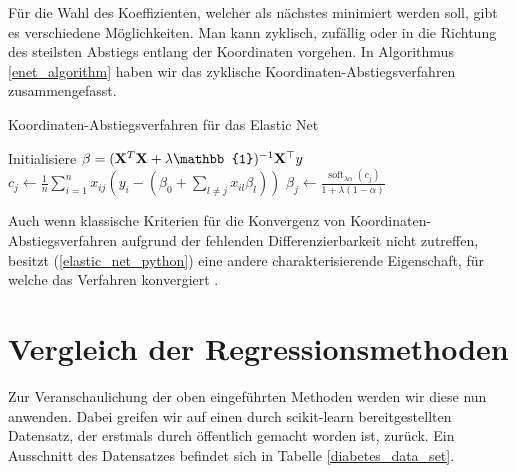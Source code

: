 Für die Wahl des Koeffizienten, welcher als nächstes minimiert werden soll, gibt es verschiedene Möglichkeiten. Man kann zyklisch, zufällig oder in die Richtung des steilsten Abstiegs entlang der Koordinaten vorgehen. In Algorithmus \ref{enet_algorithm} haben wir das zyklische Koordinaten-Abstiegsverfahren zusammengefasst.

\begin{algorithm}[tbh]
    \caption{Koordinaten-Abstiegsverfahren für das Elastic Net}
    \label{enet_algorithm}
    \begin{algorithmic}[1]
        	\State Initialisiere $\beta = (\mat X^T\mat X + \lambda\mat{\mathbb{1}})^{-1}\mat X^{\top}y$
                	\State $c_j \gets \frac{1}{n}\sum_{i=1}^n x_{ij}(y_i - (\beta_0 + \sum_{l \neq j} x_{il}\beta_l))$
                	\State $\beta_j \gets \frac{\operatorname{soft}_{\lambda\alpha}(c_j)}{1 + \lambda (1-\alpha)}$
        		\EndFor
        	\EndWhile
        \EndProcedure
    \end{algorithmic}
\end{algorithm} 

Auch wenn klassische Kriterien für die Konvergenz von Koordinaten-Abstiegsverfahren aufgrund der fehlenden Differenzierbarkeit nicht zutreffen, besitzt (\ref{elastic_net_python}) eine andere charakterisierende Eigenschaft, für welche das Verfahren konvergiert \cite{tseng}.




\section{Vergleich der Regressionsmethoden}
\label{comparison_linear_models}

Zur Veranschaulichung der oben eingeführten Methoden werden wir diese nun anwenden. Dabei greifen wir auf einen durch scikit-learn \cite{scikit_learn} bereitgestellten Datensatz, der erstmals durch \cite{efron_lars} öffentlich gemacht worden ist, zurück. Ein Ausschnitt des Datensatzes befindet sich in Tabelle \ref{diabetes_data_set}.

